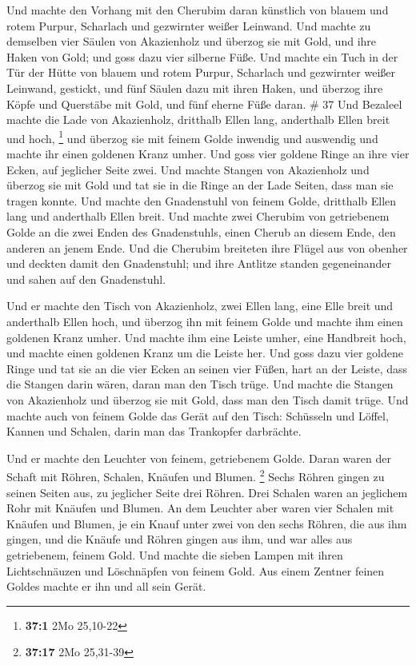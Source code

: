  Und machte den Vorhang mit den Cherubim daran künstlich
von blauem und rotem Purpur, Scharlach und gezwirnter weißer Leinwand.
 Und machte zu demselben vier Säulen von Akazienholz und
überzog sie mit Gold, und ihre Haken von Gold; und goss dazu vier
silberne Füße.  Und machte ein Tuch in der Tür der Hütte
von blauem und rotem Purpur, Scharlach und gezwirnter weißer Leinwand,
gestickt,  und fünf Säulen dazu mit ihren Haken, und
überzog ihre Köpfe und Querstäbe mit Gold, und fünf eherne Füße daran.
\# 37  Und Bezaleel machte die Lade von Akazienholz,
dritthalb Ellen lang, anderthalb Ellen breit und hoch, \footnote{\textbf{37:1}
  2Mo 25,10-22}  und überzog sie mit feinem Golde inwendig
und auswendig und machte ihr einen goldenen Kranz umher. 
Und goss vier goldene Ringe an ihre vier Ecken, auf jeglicher Seite
zwei.  Und machte Stangen von Akazienholz und überzog sie
mit Gold  und tat sie in die Ringe an der Lade Seiten, dass
man sie tragen konnte.  Und machte den Gnadenstuhl von
feinem Golde, dritthalb Ellen lang und anderthalb Ellen breit.
 Und machte zwei Cherubim von getriebenem Golde an die zwei
Enden des Gnadenstuhls,  einen Cherub an diesem Ende, den
anderen an jenem Ende.  Und die Cherubim breiteten ihre
Flügel aus von obenher und deckten damit den Gnadenstuhl; und ihre
Antlitze standen gegeneinander und sahen auf den Gnadenstuhl.

 Und er machte den Tisch von Akazienholz, zwei Ellen lang,
eine Elle breit und anderthalb Ellen hoch,  und überzog ihn
mit feinem Golde und machte ihm einen goldenen Kranz umher.
 Und machte ihm eine Leiste umher, eine Handbreit hoch, und
machte einen goldenen Kranz um die Leiste her.  Und goss
dazu vier goldene Ringe und tat sie an die vier Ecken an seinen vier
Füßen,  hart an der Leiste, dass die Stangen darin wären,
daran man den Tisch trüge.  Und machte die Stangen von
Akazienholz und überzog sie mit Gold, dass man den Tisch damit trüge.
 Und machte auch von feinem Golde das Gerät auf den Tisch:
Schüsseln und Löffel, Kannen und Schalen, darin man das Trankopfer
darbrächte.

 Und er machte den Leuchter von feinem, getriebenem Golde.
Daran waren der Schaft mit Röhren, Schalen, Knäufen und Blumen.
\footnote{\textbf{37:17} 2Mo 25,31-39}  Sechs Röhren gingen
zu seinen Seiten aus, zu jeglicher Seite drei Röhren.  Drei
Schalen waren an jeglichem Rohr mit Knäufen und Blumen.  An
dem Leuchter aber waren vier Schalen mit Knäufen und Blumen,
 je ein Knauf unter zwei von den sechs Röhren, die aus ihm
gingen,  und die Knäufe und Röhren gingen aus ihm, und war
alles aus getriebenem, feinem Gold.  Und machte die sieben
Lampen mit ihren Lichtschnäuzen und Löschnäpfen von feinem Gold.
 Aus einem Zentner feinen Goldes machte er ihn und all sein
Gerät.

